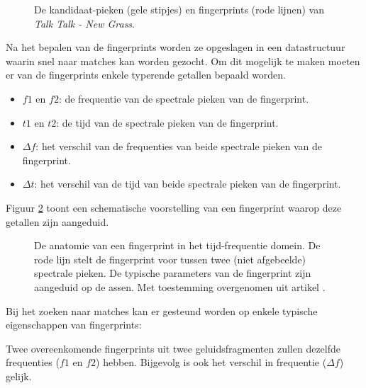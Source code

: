 \begin{figure}[h!]
	\captionsetup{width=0.7\textwidth}
	\caption[Kandidaat-pieken en fingerprints]{De kandidaat-pieken (gele stipjes) en fingerprints (rode lijnen)  van \textit{Talk Talk - New Grass}.}
	\begin{center}
		\advance\parskip0.3cm
		
	\end{center}
	\label{kandidaat-pieken}
\end{figure}

Na het bepalen van de fingerprints worden ze opgeslagen in een datastructuur waarin snel naar matches kan worden gezocht.
Om dit mogelijk te maken moeten er van de fingerprints enkele typerende getallen bepaald worden.

\begin{itemize}[noitemsep]
	\item $ f1 $ en $ f2 $: de frequentie van de spectrale pieken van de fingerprint.
	\item $ t1 $ en $ t2 $: de tijd van de spectrale pieken van de fingerprint.
	\item $ \Delta f $: het verschil van de frequenties van beide spectrale pieken van de fingerprint.
	\item $ \Delta t $: het verschil van de tijd van beide spectrale pieken van de fingerprint.
\end{itemize}

 Figuur \ref{schematische-fingerprint} toont een schematische voorstelling van een fingerprint waarop deze getallen zijn aangeduid.

\begin{figure}[h]
	\captionsetup{width=0.7\textwidth}
	\caption[De anatomie van een fingerprint]{De anatomie van een fingerprint in het tijd-frequentie domein. De rode lijn stelt de fingerprint voor tussen twee (niet afgebeelde) spectrale pieken. De typische parameters van de fingerprint zijn aangeduid op de assen. Met toestemming overgenomen uit artikel \cite{six2015multimodal}.}
	\begin{center}
		\advance\parskip0.3cm
		
	\end{center}
	\label{schematische-fingerprint}
\end{figure}

Bij het zoeken naar matches kan er gesteund worden op enkele typische eigenschappen van fingerprints: 

Twee overeenkomende fingerprints uit twee geluidsfragmenten zullen dezelfde frequenties  ($f1$ en $f2$) hebben. Bijgevolg is ook het verschil in frequentie ($\Delta f$) gelijk. 

